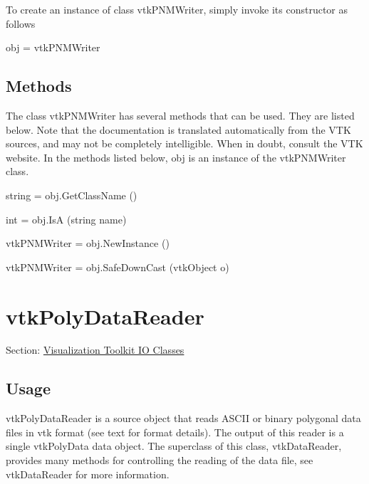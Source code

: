 To create an instance of class vtk\-P\-N\-M\-Writer, simply invoke its constructor as follows \begin{DoxyVerb}  obj = vtkPNMWriter
\end{DoxyVerb}
 \hypertarget{vtkwidgets_vtkxyplotwidget_Methods}{}\subsection{Methods}\label{vtkwidgets_vtkxyplotwidget_Methods}
The class vtk\-P\-N\-M\-Writer has several methods that can be used. They are listed below. Note that the documentation is translated automatically from the V\-T\-K sources, and may not be completely intelligible. When in doubt, consult the V\-T\-K website. In the methods listed below, {\ttfamily obj} is an instance of the vtk\-P\-N\-M\-Writer class. 
\begin{DoxyItemize}
\item {\ttfamily string = obj.\-Get\-Class\-Name ()}  
\item {\ttfamily int = obj.\-Is\-A (string name)}  
\item {\ttfamily vtk\-P\-N\-M\-Writer = obj.\-New\-Instance ()}  
\item {\ttfamily vtk\-P\-N\-M\-Writer = obj.\-Safe\-Down\-Cast (vtk\-Object o)}  
\end{DoxyItemize}\hypertarget{vtkio_vtkpolydatareader}{}\section{vtk\-Poly\-Data\-Reader}\label{vtkio_vtkpolydatareader}
Section\-: \hyperlink{sec_vtkio}{Visualization Toolkit I\-O Classes} \hypertarget{vtkwidgets_vtkxyplotwidget_Usage}{}\subsection{Usage}\label{vtkwidgets_vtkxyplotwidget_Usage}
vtk\-Poly\-Data\-Reader is a source object that reads A\-S\-C\-I\-I or binary polygonal data files in vtk format (see text for format details). The output of this reader is a single vtk\-Poly\-Data data object. The superclass of this class, vtk\-Data\-Reader, provides many methods for controlling the reading of the data file, see vtk\-Data\-Reader for more information.

